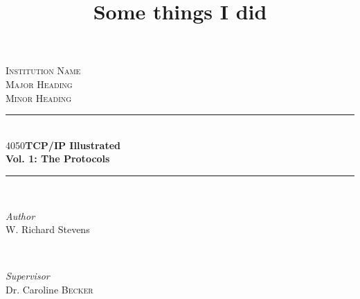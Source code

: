 \documentclass[12pt]{ctexbook}
\title{Some things I did}
\makeatletter
\newcommand\HUGE{\@setfontsize\Huge{40}{50}}
\makeatother
\begin{document}
\begin{titlepage} %
  \newcommand{\HRule}{\rule{\linewidth}{0.5mm}} %

  \center %


  \textsc{\LARGE Institution Name}\\[1.5cm] %

  \textsc{\Large Major Heading}\\[0.5cm] %

  \textsc{\large Minor Heading}\\[0.5cm] %


  \HRule\\[0.4cm]

  {\HUGE\bfseries TCP/IP Illustrated}\\[0.5cm] %
  {\huge\bfseries Vol. 1: The Protocols}\\[0.3cm] %

  \HRule\\[1.5cm]


  \begin{minipage}{0.4\textwidth}
    \begin{flushleft}
      \large
      \textit{Author}\\
      W. Richard Stevens
    \end{flushleft}
  \end{minipage}
  ~
  \begin{minipage}{0.4\textwidth}
    \begin{flushright}
      \large
      \textit{Supervisor}\\
      Dr. Caroline \textsc{Becker} %
    \end{flushright}
  \end{minipage}


\end{titlepage}
\end{document}
